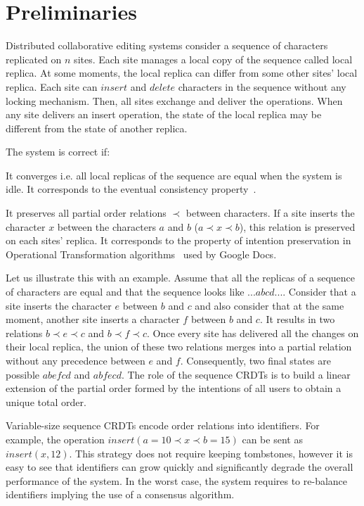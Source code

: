 \section{Preliminaries}
\label{sec:background}

Distributed collaborative editing systems consider a sequence of characters
replicated on $n$ sites. Each site manages a local copy of the sequence called
local replica. At some moments, the local replica can differ from some other
sites' local replica. Each site can $insert$ and $delete$ characters in the
sequence without any locking mechanism. Then, all sites exchange and deliver
the operations. When any site delivers an insert operation, the state of the
local replica may be different from the state of another replica.

The system is correct if:
\begin{inparaenum}[(i)]
\item It converges i.e. all local replicas of the sequence are equal when the
  system is idle. It corresponds to the eventual consistency
  property~\cite{johnson1975maintenance}.
\item It preserves all partial order relations $\prec$ between characters. If a
  site inserts the character $x$ between the characters $a$ and $b$ ($a \prec x
  \prec b$), this relation is preserved on each sites' replica. It
  corresponds to the property of intention preservation in Operational
  Transformation algorithms~\cite{sun1998achieving} used by Google Docs.
\end{inparaenum}

Let us illustrate this with an example. Assume that all the replicas of a
sequence of characters are equal and that the sequence looks like
$...abcd...$. Consider that a site inserts the character $e$ between $b$ and
$c$ and also consider that at the same moment, another site inserts a character
$f$ between $b$ and $c$. It results in two relations $b \prec e \prec c$ and $b
\prec f \prec c$. Once every site has delivered all the changes on their local
replica, the union of these two relations merges into a partial relation
without any precedence between $e$ and $f$. Consequently, two final states are
possible $abefcd$ and $abfecd$. The role of the sequence CRDTs is to build a
linear extension of the partial order formed by the intentions of all users to
obtain a unique total order.

Variable-size sequence CRDTs encode order relations into identifiers. For
example, the operation $insert(a=10 \prec x \prec b=15)$ can be sent as
$insert(x,12)$. This strategy does not require keeping tombstones, however it
is easy to see that identifiers can grow quickly and significantly degrade the
overall performance of the system. In the worst case, the system requires to
re-balance identifiers implying the use of a consensus algorithm.

